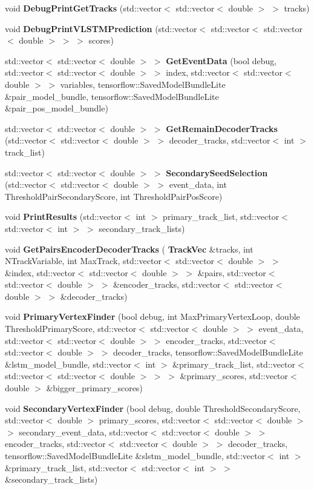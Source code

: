 \begin{DoxyCompactItemize}
void \textbf{ Debug\+Print\+Get\+Tracks} (std\+::vector$<$ std\+::vector$<$ double $>$ $>$ tracks)
\item 
void \textbf{ Debug\+Print\+V\+L\+S\+T\+M\+Prediction} (std\+::vector$<$ std\+::vector$<$ std\+::vector$<$ double $>$ $>$ $>$ scores)
\item 
std\+::vector$<$ std\+::vector$<$ double $>$ $>$ \textbf{ Get\+Event\+Data} (bool debug, std\+::vector$<$ std\+::vector$<$ double $>$ $>$ index, std\+::vector$<$ std\+::vector$<$ double $>$ $>$ variables, tensorflow\+::\+Saved\+Model\+Bundle\+Lite \&pair\+\_\+model\+\_\+bundle, tensorflow\+::\+Saved\+Model\+Bundle\+Lite \&pair\+\_\+pos\+\_\+model\+\_\+bundle)
\item 
std\+::vector$<$ std\+::vector$<$ double $>$ $>$ \textbf{ Get\+Remain\+Decoder\+Tracks} (std\+::vector$<$ std\+::vector$<$ double $>$ $>$ decoder\+\_\+tracks, std\+::vector$<$ int $>$ track\+\_\+list)
\item 
std\+::vector$<$ std\+::vector$<$ double $>$ $>$ \textbf{ Secondary\+Seed\+Selection} (std\+::vector$<$ std\+::vector$<$ double $>$ $>$ event\+\_\+data, int Threshold\+Pair\+Secondary\+Score, int Threshold\+Pair\+Pos\+Score)
\item 
void \textbf{ Print\+Results} (std\+::vector$<$ int $>$ primary\+\_\+track\+\_\+list, std\+::vector$<$ std\+::vector$<$ int $>$ $>$ secondary\+\_\+track\+\_\+lists)
\item 
void \textbf{ Get\+Pairs\+Encoder\+Decoder\+Tracks} (\textbf{ Track\+Vec} \&tracks, int N\+Track\+Variable, int Max\+Track, std\+::vector$<$ std\+::vector$<$ double $>$ $>$ \&index, std\+::vector$<$ std\+::vector$<$ double $>$ $>$ \&pairs, std\+::vector$<$ std\+::vector$<$ double $>$ $>$ \&encoder\+\_\+tracks, std\+::vector$<$ std\+::vector$<$ double $>$ $>$ \&decoder\+\_\+tracks)
\item 
void \textbf{ Primary\+Vertex\+Finder} (bool debug, int Max\+Primary\+Vertex\+Loop, double Threshold\+Primary\+Score, std\+::vector$<$ std\+::vector$<$ double $>$ $>$ event\+\_\+data, std\+::vector$<$ std\+::vector$<$ double $>$ $>$ encoder\+\_\+tracks, std\+::vector$<$ std\+::vector$<$ double $>$ $>$ decoder\+\_\+tracks, tensorflow\+::\+Saved\+Model\+Bundle\+Lite \&lstm\+\_\+model\+\_\+bundle, std\+::vector$<$ int $>$ \&primary\+\_\+track\+\_\+list, std\+::vector$<$ std\+::vector$<$ std\+::vector$<$ double $>$ $>$ $>$ \&primary\+\_\+scores, std\+::vector$<$ double $>$ \&bigger\+\_\+primary\+\_\+scores)
\item 
void \textbf{ Secondary\+Vertex\+Finder} (bool debug, double Threshold\+Secondary\+Score, std\+::vector$<$ double $>$ primary\+\_\+scores, std\+::vector$<$ std\+::vector$<$ double $>$ $>$ secondary\+\_\+event\+\_\+data, std\+::vector$<$ std\+::vector$<$ double $>$ $>$ encoder\+\_\+tracks, std\+::vector$<$ std\+::vector$<$ double $>$ $>$ decoder\+\_\+tracks, tensorflow\+::\+Saved\+Model\+Bundle\+Lite \&slstm\+\_\+model\+\_\+bundle, std\+::vector$<$ int $>$ \&primary\+\_\+track\+\_\+list, std\+::vector$<$ std\+::vector$<$ int $>$ $>$ \&secondary\+\_\+track\+\_\+lists)

\end{DoxyCompactItemize}
